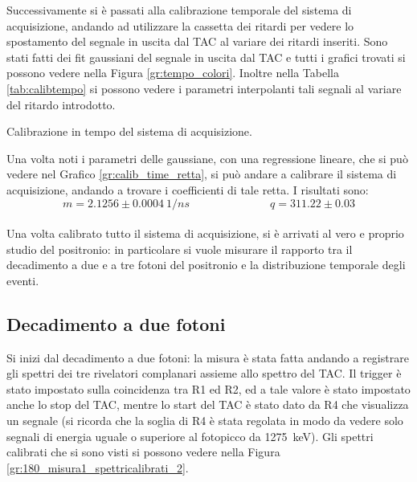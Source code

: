 Successivamente si è passati alla calibrazione temporale del sistema di acquisizione, andando ad utilizzare la cassetta dei ritardi per vedere lo spostamento del
segnale in uscita dal TAC al variare dei ritardi inseriti. Sono stati fatti dei fit gaussiani del segnale in uscita dal TAC e tutti i grafici trovati si possono
vedere nella Figura \ref{gr:tempo_colori}. Inoltre nella Tabella \ref{tab:calibtempo} si possono vedere i parametri interpolanti tali segnali
al variare del ritardo introdotto.\\

\begin{table}[h]
	\centering
	
	\caption{Calibrazione in tempo del sistema di acquisizione.}
	\label{tab:calibtempo}
\end{table}

Una volta noti i parametri delle gaussiane, con una regressione lineare, che si può vedere nel Grafico \ref{gr:calib_time_retta}, si può andare a calibrare il sistema di
acquisizione, andando a trovare i coefficienti di tale retta. I risultati sono:
$$ m= 2.1256 \pm 0.0004\ 1/ns \hspace{3cm} q = 311.22 \pm 0.03$$\\



Una volta calibrato tutto il sistema di acquisizione, si è arrivati al vero e proprio studio del positronio: in particolare si vuole misurare il rapporto tra il decadimento
a due e a tre fotoni del positronio e la distribuzione temporale degli eventi.\\

\FloatBarrier
\subsection{Decadimento a due fotoni}

Si inizi dal decadimento a due fotoni: la misura è stata fatta andando a registrare gli spettri dei tre rivelatori complanari assieme allo spettro del TAC. Il
trigger è stato impostato sulla coincidenza tra R1 ed R2, ed a tale valore è stato impostato anche lo stop del TAC, mentre lo start del TAC è stato dato da R4 che visualizza
un segnale (si ricorda che la soglia di R4 è stata regolata in modo da vedere solo segnali di energia uguale o superiore al fotopicco da 1275~keV). Gli spettri calibrati che
si sono visti si possono vedere nella Figura \ref{gr:180_misura1_spettricalibrati_2}.\\


